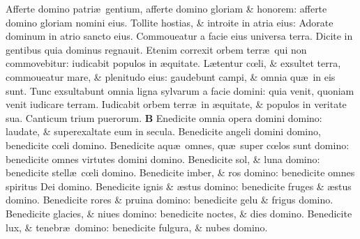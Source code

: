 \documentclass[a5paper,10pt]{book}
\def\ae{æ}
\def\oe{œ}
\begin{document}
\begin{multicols*}{2}
\newline \color{red} A\color{black}fferte domino patri\ae \ gentium, afferte domino gloriam \& honorem: afferte domino gloriam nomini eius.
\newline \color{red} T\color{black}ollite hostias, \& introite in atria eius: Adorate dominum in atrio sancto eius.
\newline \color{red} C\color{black}ommoueatur a facie eius universa terra. Dicite in gentibus quia dominus regnauit.
\newline \color{red} E\color{black}tenim correxit orbem terr\ae \ qui non commovebitur: iudicabit populos in \ae quitate.
\newline \color{red} L\color{black}\ae tentur c\oe li, \& exsultet terra, commoueatur mare, \& plenitudo eius: gaudebunt campi, \& omnia qu\ae \ in eis sunt.
\newline \color{red} T\color{black}unc exsultabunt omnia ligna sylvarum a facie domini: quia venit, quoniam venit iudicare terram.
\newline \color{red} I\color{black}udicabit orbem terr\ae \ in \ae quitate, \& populos in veritate sua.
\newline \color{red} Canticum trium puerorum. \color{black}
\vspace{-1em}
\lettrine[lines=2]{\bfseries \color{red} B}{}
Enedicite omnia opera domini domino: laudate, \& superexaltate eum in secula.
\newline \color{red} B\color{black}enedicite angeli domini domino, benedicite c\oe li domino.
\newline \color{red} B\color{black}enedicite aqu\ae \ omnes, qu\ae \ super c\oe los sunt domino: benedicite omnes virtutes domini domino.
\newline \color{red} B\color{black}enedicite sol, \& luna domino: benedicite stell\ae \ c\oe li domino.
\newline \color{red} B\color{black}enedicite imber, \& ros domino: benedicite omnes spiritus Dei domino.
\newline \color{red} B\color{black}enedicite ignis \& \ae stus domino: benedicite fruges \& \ae stus domino.
\newline \color{red} B\color{black}enedicite rores \& pruina domino: benedicite gelu \& frigus domino.
\newline \color{red} B\color{black}enedicite glacies, \& niues domino: benedicite noctes, \& dies domino.
\newline \color{red} B\color{black}enedicite lux, \& tenebr\ae \ domino: benedicite fulgura, \& nubes domino.

\end{multicols*}
\end{document}
